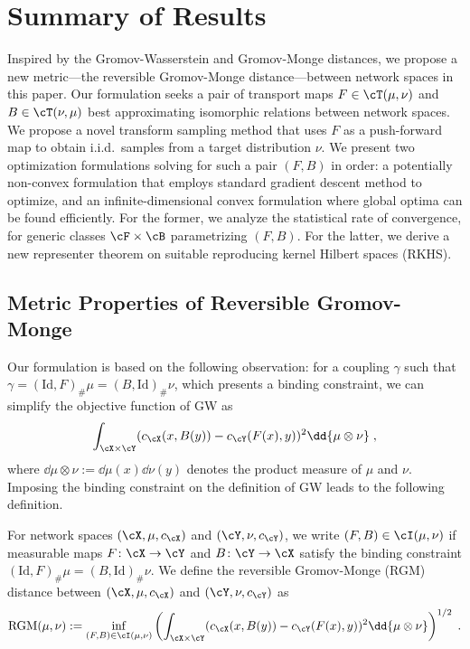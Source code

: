\documentclass[11pt]{article}
\begin{document}
\section{Summary of Results}
\label{sec:summary-of-results}
Inspired by the Gromov-Wasserstein and Gromov-Monge distances, we propose a new metric---the reversible Gromov-Monge distance---between network spaces in this paper. Our formulation seeks a pair of transport maps $F \in \cT(\mu, \nu)$ and $B \in \cT(\nu, \mu)$ best approximating isomorphic relations between network spaces. We propose a novel transform sampling method that uses $F$ as a push-forward map to obtain i.i.d.\ samples from a target distribution $\nu$.
We present two optimization formulations solving for such a pair $(F, B)$ in order: a potentially non-convex formulation that employs standard gradient descent method to optimize, and an infinite-dimensional convex formulation where global optima can be found efficiently. For the former, we analyze the statistical rate of convergence, for generic classes $\cF \times \cB$ parametrizing $(F, B)$. For the latter, we derive a new representer theorem on suitable reproducing kernel Hilbert spaces (RKHS).

\subsection{Metric Properties of Reversible Gromov-Monge}
Our formulation is based on the following observation: for a coupling $\gamma$ such that $\gamma = (\mathrm{Id}, F)_{\#}\mu = (B, \mathrm{Id})_{\#} \nu$, which presents a binding constraint, we can simplify the objective function of GW as
\begin{equation*}
	\int_{\cX \times \cY} (c_{\cX}(x, B(y)) - c_{\cY}(F(x), y))^2 \dd{\mu \otimes \nu} \;,
\end{equation*}
where $\dd{\mu \otimes \nu} := \dd{\mu}(x) \dd{\nu}(y)$ denotes the product measure of $\mu$ and $\nu$.
Imposing the binding constraint on the definition of GW leads to the following definition.
\begin{definition}
	For network spaces $(\cX, \mu, c_{\cX})$ and $(\cY, \nu, c_{\cY})$, we write $(F, B) \in \cI(\mu, \nu)$ if measurable maps $F \colon \cX \to \cY$ and $B \colon \cY \to \cX$ satisfy the binding constraint $(\mathrm{Id}, F)_{\#}\mu = (B, \mathrm{Id})_{\#} \nu$. We define the reversible Gromov-Monge (RGM) distance between $(\cX, \mu, c_{\cX})$ and $(\cY, \nu, c_{\cY})$ as
	\begin{equation*}
		\mathrm{RGM}(\mu, \nu) := \inf_{(F, B) \in \cI(\mu, \nu)} \left(\int_{\cX \times \cY} (c_{\cX}(x, B(y)) - c_{\cY}(F(x), y))^2 \dd{\mu \otimes \nu}\right)^{1/2}\;.
	\end{equation*}
\end{definition}
\end{document}
